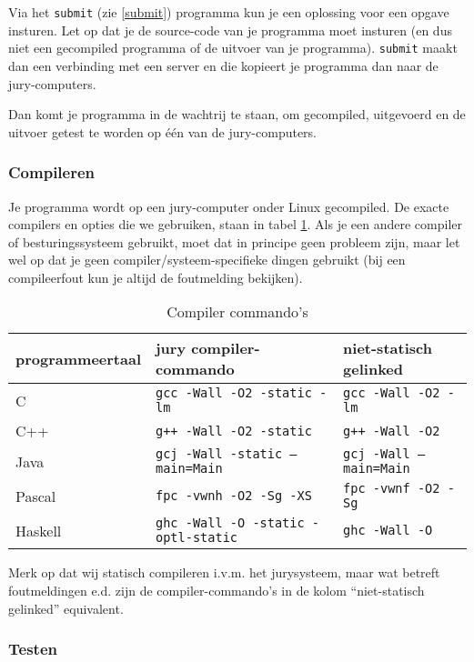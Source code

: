 \documentclass[11pt,titlepage,a4paper]{article}
\begin{document}
Via het \texttt{submit} (zie \ref{submit}) programma kun je een
oplossing voor een opgave insturen. Let op dat je de source-code van
je programma moet insturen (en dus niet een gecompiled programma of de
uitvoer van je programma). \texttt{submit} maakt dan een verbinding
met een server en die kopieert je programma dan naar de
jury-computers.

Dan komt je programma in de wachtrij te staan, om gecompiled,
uitgevoerd en de uitvoer getest te worden op \'e\'en van de
jury-computers.

\subsubsection{Compileren}

Je programma wordt op een jury-computer onder Linux gecompiled. De
exacte compilers en opties die we gebruiken, staan in tabel
\ref{compilertabel}. Als je een andere compiler of besturingssysteem
gebruikt, moet dat in principe geen probleem zijn, maar let wel op dat
je geen compiler/systeem-specifieke dingen gebruikt (bij een
compileerfout kun je altijd de foutmelding bekijken).

\begin{table}[!ht]
\caption{Compiler commando's}
\begin{tabular}{|l|l|l|}
\hline
programmeertaal & jury compiler-commando & niet-statisch gelinked \\
\hline
C		& \texttt{gcc -Wall -O2 -static -lm}		& \texttt{gcc -Wall -O2 -lm}\\
C++		& \texttt{g++ -Wall -O2 -static}			& \texttt{g++ -Wall -O2}\\
Java	& \texttt{gcj -Wall -static --main=Main}	& \texttt{gcj -Wall --main=Main}\\
Pascal	& \texttt{fpc -vwnh -O2 -Sg -XS}			& \texttt{fpc -vwnf -O2 -Sg}\\
Haskell	& \texttt{ghc -Wall -O -static -optl-static}& \texttt{ghc -Wall -O}\\
\hline
\end{tabular}
\label{compilertabel}
\end{table}

Merk op dat wij statisch compileren i.v.m. het jurysysteem, maar wat
betreft foutmeldingen e.d. zijn de compiler-commando's in de kolom
``niet-statisch gelinked'' equivalent.

\subsubsection{Testen}
\end{document}
